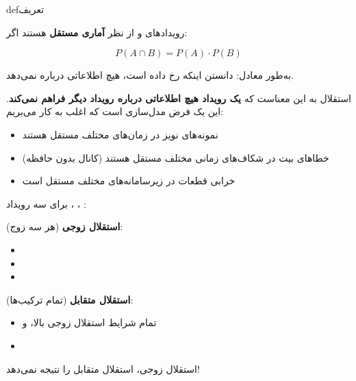 
\begin{PSbox}[unbreakable]{def}{تعریف}

رویدادهای  و  از نظر \textbf{آماری مستقل} هستند اگر:

\[P(A \cap B) = P(A) \cdot P(B)\]

به‌طور معادل:  دانستن اینکه  رخ داده است، هیچ اطلاعاتی درباره  نمی‌دهد.

\end{PSbox}


استقلال به این معناست که \textbf{یک رویداد هیچ اطلاعاتی درباره رویداد دیگر فراهم نمی‌کند}. این یک فرض مدل‌سازی است که اغلب به کار می‌بریم:

\begin{itemize}
\tightlist
\item
  نمونه‌های نویز در زمان‌های مختلف مستقل هستند
\item
  خطاهای بیت در شکاف‌های زمانی مختلف مستقل هستند (کانال بدون حافظه)
\item
  خرابی قطعات در زیرسامانه‌های مختلف مستقل است
\end{itemize}


برای سه رویداد ، ، :

\textbf{استقلال زوجی} (هر سه زوج):

\begin{itemize}
\tightlist
\item
\item
\item
\end{itemize}

\textbf{استقلال متقابل} (تمام ترکیب‌ها):

\begin{itemize}
\tightlist
\item
  تمام شرایط استقلال زوجی بالا، و
\item
\end{itemize}

\begin{PSquote}

\lr{\PSwarn{}} استقلال زوجی، استقلال متقابل را نتیجه نمی‌دهد!

\end{PSquote}

